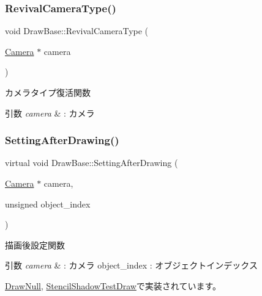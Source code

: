 \subsubsection{\texorpdfstring{Revival\+Camera\+Type()}{RevivalCameraType()}}
{\footnotesize\ttfamily void Draw\+Base\+::\+Revival\+Camera\+Type (\begin{DoxyParamCaption}\item[{\mbox{\hyperlink{class_camera}{Camera}} $\ast$}]{camera }\end{DoxyParamCaption})\hspace{0.3cm}{\ttfamily [inline]}}



カメラタイプ復活関数 


\begin{DoxyParams}{引数}
{\em camera} & \+: カメラ \\
\hline
\end{DoxyParams}
\mbox{\label{class_draw_base_afe64f27b0bbf8c45da7aa0de4c3f3d65}} 
\subsubsection{\texorpdfstring{Setting\+After\+Drawing()}{SettingAfterDrawing()}}
{\footnotesize\ttfamily virtual void Draw\+Base\+::\+Setting\+After\+Drawing (\begin{DoxyParamCaption}\item[{\mbox{\hyperlink{class_camera}{Camera}} $\ast$}]{camera,  }\item[{unsigned}]{object\+\_\+index }\end{DoxyParamCaption})\hspace{0.3cm}{\ttfamily [pure virtual]}}



描画後設定関数 


\begin{DoxyParams}{引数}
{\em camera} & \+: カメラ object\+\_\+index \+: オブジェクトインデックス \\
\hline
\end{DoxyParams}


\mbox{\hyperlink{class_draw_null_a76edfc5af0bf3275f96f40394aff8510}{Draw\+Null}}, \mbox{\hyperlink{class_stencil_shadow_test_draw_a68917115d3f151ed91ce297924ee5bbb}{Stencil\+Shadow\+Test\+Draw}}で実装されています。

